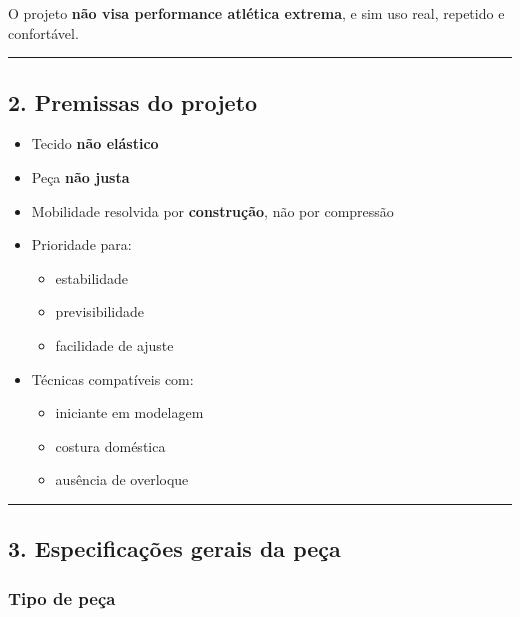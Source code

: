 \documentclass[
  10pt,oneside]{article}
\providecommand{\tightlist}{%
  \setlength{\itemsep}{0pt}\setlength{\parskip}{0pt}}
\begin{document}
O projeto \textbf{não visa performance atlética extrema}, e sim uso real, repetido e confortável.

\begin{center}\rule{0.5\linewidth}{0.5pt}\end{center}

\subsection{2. Premissas do projeto}\label{premissas-do-projeto}

\begin{itemize}
\tightlist
\item
  Tecido \textbf{não elástico}
\item
  Peça \textbf{não justa}
\item
  Mobilidade resolvida por \textbf{construção}, não por compressão
\item
  Prioridade para:

  \begin{itemize}
  \tightlist
  \item
    estabilidade
  \item
    previsibilidade
  \item
    facilidade de ajuste
  \end{itemize}
\item
  Técnicas compatíveis com:

  \begin{itemize}
  \tightlist
  \item
    iniciante em modelagem
  \item
    costura doméstica
  \item
    ausência de overloque
  \end{itemize}
\end{itemize}

\begin{center}\rule{0.5\linewidth}{0.5pt}\end{center}

\subsection{3. Especificações gerais da peça}\label{especificauxe7uxf5es-gerais-da-peuxe7a}

\subsubsection{Tipo de peça}\label{tipo-de-peuxe7a}
\end{document}
